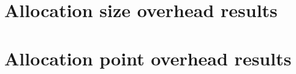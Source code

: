 \section{Allocation size overhead results}
\label{section:testprogram}

\section{Allocation point overhead results}
\label{section:testprogram}

